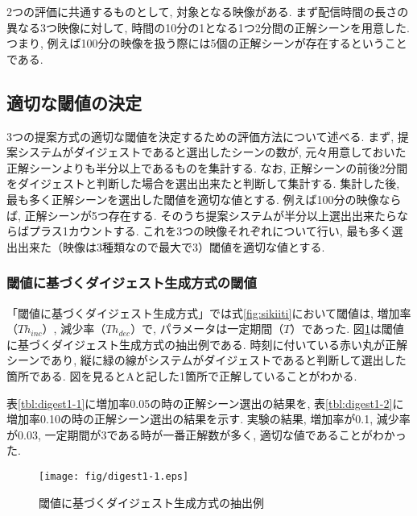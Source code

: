 2つの評価に共通するものとして, 対象となる映像がある. まず配信時間の長さの異なる3つ映像に対して, 時間の10分の1となる1つ2分間の正解シーンを用意した. つまり, 例えば100分の映像を扱う際には5個の正解シーンが存在するということである.

\subsection{適切な閾値の決定}
3つの提案方式の適切な閾値を決定するための評価方法について述べる. まず, 提案システムがダイジェストであると選出したシーンの数が, 元々用意しておいた正解シーンよりも半分以上であるものを集計する. なお, 正解シーンの前後2分間をダイジェストと判断した場合を選出出来たと判断して集計する. 集計した後, 最も多く正解シーンを選出した閾値を適切な値とする. 例えば100分の映像ならば, 正解シーンが5つ存在する. そのうち提案システムが半分以上選出出来たらならばプラス1カウントする. これを3つの映像それぞれについて行い, 最も多く選出出来た（映像は3種類なので最大で3）閾値を適切な値とする.

\subsubsection{閾値に基づくダイジェスト生成方式の閾値}
「閾値に基づくダイジェスト生成方式」では式\ref{fig:sikiiti}において閾値は, 増加率（$Th_{inc}$）, 減少率（$Th_{dec}$）で, パラメータは一定期間（$T$）であった. 図\ref{fig:digest1-1}は閾値に基づくダイジェスト生成方式の抽出例である. 時刻に付いている赤い丸が正解シーンであり, 縦に緑の線がシステムがダイジェストであると判断して選出した箇所である. 図を見るとAと記した1箇所で正解していることがわかる.

表\ref{tbl:digest1-1}に増加率0.05の時の正解シーン選出の結果を, 表\ref{tbl:digest1-2}に増加率0.10の時の正解シーン選出の結果を示す. 実験の結果, 増加率が0.1, 減少率が0.03, 一定期間が3である時が一番正解数が多く, 適切な値であることがわかった.

\begin{figure}[h]
  \centering
  \texttt{[image: fig/digest1-1.eps]}
  \caption{閾値に基づくダイジェスト生成方式の抽出例}
  \label{fig:digest1-1}
\end{figure}

